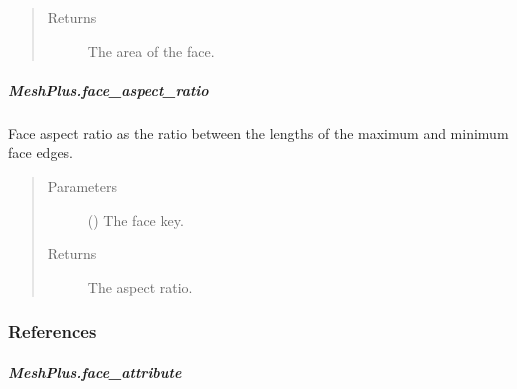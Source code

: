 \documentclass[letterpaper,10pt,english]{sphinxmanual}
\begin{document}
\begin{fulllineitems}
\begin{fulllineitems}
\begin{quote}
\begin{description}
\item[{Returns}] \leavevmode
{} \textendash{} The area of the face.

\end{description}\end{quote}

\end{fulllineitems}



\subparagraph{MeshPlus.face\_aspect\_ratio}
\label{\detokenize{api/generated/directional_clustering.mesh.MeshPlus.face_aspect_ratio:meshplus-face-aspect-ratio}}\label{\detokenize{api/generated/directional_clustering.mesh.MeshPlus.face_aspect_ratio::doc}}

\begin{fulllineitems}
\label{\detokenize{api/generated/directional_clustering.mesh.MeshPlus.face_aspect_ratio:directional_clustering.mesh.MeshPlus.face_aspect_ratio}}
Face aspect ratio as the ratio between the lengths of the maximum and minimum face edges.
\begin{quote}\begin{description}
\item[{Parameters}] \leavevmode
{} () \textendash{} The face key.

\item[{Returns}] \leavevmode
{} \textendash{} The aspect ratio.

\end{description}\end{quote}
\subsubsection*{References}

\end{fulllineitems}



\subparagraph{MeshPlus.face\_attribute}
\label{\detokenize{api/generated/directional_clustering.mesh.MeshPlus.face_attribute:meshplus-face-attribute}}\label{\detokenize{api/generated/directional_clustering.mesh.MeshPlus.face_attribute::doc}}


\end{fulllineitems}
\end{document}
